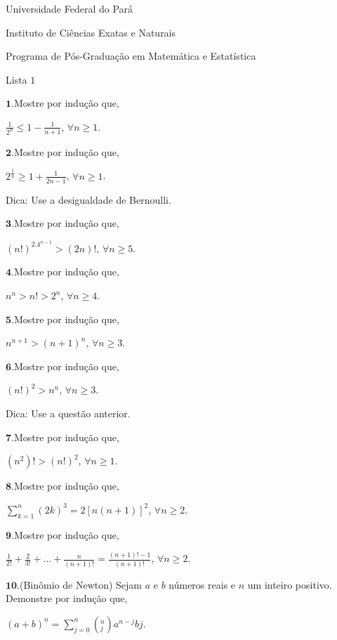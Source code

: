\documentclass[onecolumn,a4paper,12pt]{report}
\newcommand{\+}{\, + \,}
\newcommand{\<}{\hspace*{-0.4cm}}
\begin{document}
\begin{center}
Universidade Federal do Pará

Instituto de Ciências Exatas e Naturais

Programa de Pós-Graduação em Matemática e Estatística
\end{center}

\begin{center}
Lista $1$
\end{center}


$\mathbf{1}$.Mostre por indução que,
\begin{center}
$\frac{1}{2^n} \leq 1 - \frac{1}{n + 1}$, $\forall n \geq 1$.
\end{center}

$\mathbf{2}$.Mostre por indução que,
\begin{center}
$ 2^{\frac{1}{n}} \geq 1 + \frac{1}{2n - 1}$, $\forall n \geq 1$.
\end{center}


Dica: Use a desigualdade de Bernoulli.


$\mathbf{3}$.Mostre por indução que,
\begin{center}
$(n!)^2.4^{n-1} > (2n)!$,  $\forall n \geq 5$.
\end{center}




$\mathbf{4}$.Mostre por indução que,
\begin{center}
$n^{n} > n! > 2^n$,  $\forall n \geq 4$.
\end{center}


$\mathbf{5}$.Mostre por indução que,
\begin{center}
$n^{n+1} > (n+1)^n$,  $\forall n \geq 3$.
\end{center}


$\mathbf{6}$.Mostre por indução que,
\begin{center}
$(n!)^2 > n^{n}$, $ \forall n \geq 3$.
\end{center}


Dica: Use a questão anterior.


$\mathbf{7}$.Mostre por indução que,
\begin{center}
$(n^{2})! > (n!)^2$, $\forall n \geq 1$.
\end{center}

$\mathbf{8}$.Mostre por indução que,
\begin{center}
$\displaystyle\sum^{n}_{k=1} (2k)^3 = 2[n(n+1)]^2$, $\forall n
\geq 2$.
\end{center}

$\mathbf{9}$.Mostre por indução que,
\begin{center}
$\frac{1}{2!} + \frac{2}{3!} + ... + \frac{n}{(n+1)!} =
\frac{(n+1)! - 1}{(n+1)!}$,  $\forall n \geq 2$.
\end{center}

$\mathbf{10}$.(Binômio de Newton) Sejam $a$ e $b$ números reais e
$n$ um inteiro positivo. Demonstre por indução que,
\begin{center}
$(a + b)^n = \displaystyle{\sum^{n}_{j=0}}
\left(^{n}_{j}\right)a^{n-j}b{j}$.
\end{center}
\end{document}
